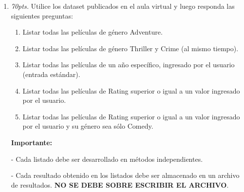 \documentclass[10pt]{article}
\newcommand*\circled[1]{\tikz[baseline=(char.base)]{\node[shape=circle,blue,draw,inner sep=.5pt] (char) {#1};}}
\begin{document}
{\begin{enumerate}
\begin{multicols}{2}
			\begin{enumerate}[label=(\alph*)]
				\item[x.] \textbf{Excepci\'on/es a considerar al manipular archivos}.
				\item[(a)] \texttt{IOExceptionFile} 
				\item[(b)] \texttt{IOExceptionArchive} 
				\item[\circled{(c)}] \texttt{IOException}
				\item[(d)] \texttt{ExceptionIO}
				\item[(e)] \texttt{ExceptionEx}
			\end{enumerate}
		\end{multicols}
		
		\newpage

		\item \emph{70pts.} Utilice los dataset publicados en el aula virtual y luego responda las siguientes preguntas:
		
		\begin{enumerate}
		    \item Listar todas las pel\'iculas de g\'enero Adventure.
		    \item Listar todas las pel\'iculas de g\'enero Thriller y Crime (al mismo tiempo).
           \item Listar todas las pel\'iculas de un a\~no espec\'ifico, ingresado por el usuario (entrada est\'andar).
           \item Listar todas las pel\'iculas de Rating superior o igual a un valor ingresado por el usuario.
           \item Listar todas las pel\'iculas de Rating superior o igual a un valor ingresado por el usuario y su g\'enero sea s\'olo Comedy.
		\end{enumerate}
	\end{enumerate}

   
    \begin{enumerate}
        \item[ ] \textbf{Importante:}
		\item[-] Cada listado debe ser desarrollado en m\'etodos independientes.
		\item[-] Cada resultado obtenido en los listados debe ser almacenado en un archivo de resultados. \textbf{NO SE DEBE SOBRE ESCRIBIR EL ARCHIVO}.
    \end{enumerate}
}
\end{document}
